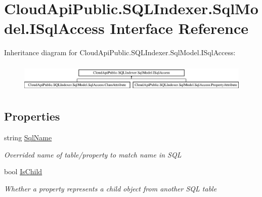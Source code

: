 \hypertarget{interface_cloud_api_public_1_1_s_q_l_indexer_1_1_sql_model_1_1_i_sql_access}{\section{Cloud\-Api\-Public.\-S\-Q\-L\-Indexer.\-Sql\-Model.\-I\-Sql\-Access Interface Reference}
\label{interface_cloud_api_public_1_1_s_q_l_indexer_1_1_sql_model_1_1_i_sql_access}
}
Inheritance diagram for Cloud\-Api\-Public.\-S\-Q\-L\-Indexer.\-Sql\-Model.\-I\-Sql\-Access\-:\begin{figure}[H]
\begin{center}
\leavevmode
\includegraphics[height=1.410579cm]{interface_cloud_api_public_1_1_s_q_l_indexer_1_1_sql_model_1_1_i_sql_access}
\end{center}
\end{figure}
\subsection*{Properties}
\begin{DoxyCompactItemize}
\item 
string \hyperlink{interface_cloud_api_public_1_1_s_q_l_indexer_1_1_sql_model_1_1_i_sql_access_adf152d3565c153abd97398874cfe0609}{Sql\-Name}
\begin{DoxyCompactList}\small\item\em Overrided name of table/property to match name in S\-Q\-L \end{DoxyCompactList}\item 
bool \hyperlink{interface_cloud_api_public_1_1_s_q_l_indexer_1_1_sql_model_1_1_i_sql_access_a1fd304ea212e06ebaa3a7c420e6c043d}{Is\-Child}
\begin{DoxyCompactList}\small\item\em Whether a property represents a child object from another S\-Q\-L table \end{DoxyCompactList}\end{DoxyCompactItemize}


